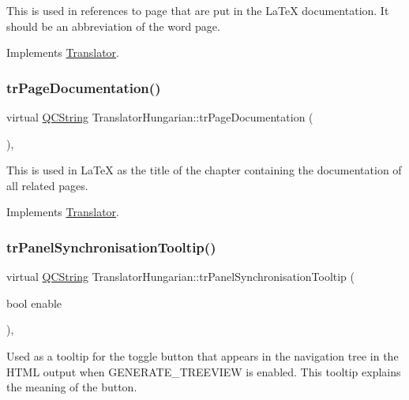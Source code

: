 This is used in references to page that are put in the La\+TeX documentation. It should be an abbreviation of the word page. 

Implements \mbox{\hyperlink{class_translator}{Translator}}.

\mbox{\label{class_translator_hungarian_a3a0ed4870c506385f11cee408505f516}} 
\subsubsection{\texorpdfstring{trPageDocumentation()}{trPageDocumentation()}}
{\footnotesize\ttfamily virtual \mbox{\hyperlink{class_q_c_string}{Q\+C\+String}} Translator\+Hungarian\+::tr\+Page\+Documentation (\begin{DoxyParamCaption}{ }\end{DoxyParamCaption})\hspace{0.3cm}{\ttfamily [inline]}, {\ttfamily [virtual]}}

This is used in La\+TeX as the title of the chapter containing the documentation of all related pages. 

Implements \mbox{\hyperlink{class_translator}{Translator}}.

\mbox{\label{class_translator_hungarian_af71f673c4752de4d5769332972978a11}} 
\subsubsection{\texorpdfstring{trPanelSynchronisationTooltip()}{trPanelSynchronisationTooltip()}}
{\footnotesize\ttfamily virtual \mbox{\hyperlink{class_q_c_string}{Q\+C\+String}} Translator\+Hungarian\+::tr\+Panel\+Synchronisation\+Tooltip (\begin{DoxyParamCaption}\item[{bool}]{enable }\end{DoxyParamCaption})\hspace{0.3cm}{\ttfamily [inline]}, {\ttfamily [virtual]}}

Used as a tooltip for the toggle button that appears in the navigation tree in the H\+T\+ML output when G\+E\+N\+E\+R\+A\+T\+E\+\_\+\+T\+R\+E\+E\+V\+I\+EW is enabled. This tooltip explains the meaning of the button. 

